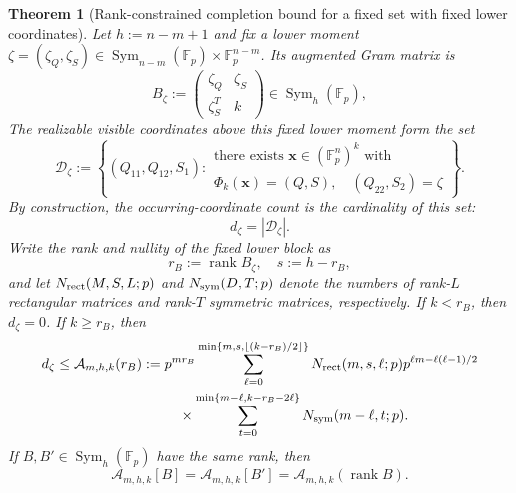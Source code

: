 \documentclass[11pt]{article}
\newcommand{\F}{\mathbb F}
\newcommand{\Sym}{\operatorname{Sym}}
\newcommand{\rank}{\operatorname{rank}}
\newcommand{\1}{\mathbf 1}
\theoremstyle{plain}
\newtheorem{theorem}{Theorem}[section]
\theoremstyle{definition}
\theoremstyle{remark}
\begin{document}
\begin{theorem}[Rank-constrained completion bound for a fixed set with fixed lower coordinates]
\label{thm:completion-bound-converse}
Let $h:=n-m+1$ and fix a lower moment
$\zeta=(\zeta_Q,\zeta_S)\in
\Sym_{n-m}(\F_p)\times\F_p^{n-m}$.  Its augmented Gram matrix is
\begin{equation}
 B_{\zeta}:=
 \begin{pmatrix}\zeta_Q&\zeta_S\\\zeta_S^T&k\end{pmatrix}
 \in\Sym_h(\F_p),
 \label{eq:completion-theorem-B-zeta}
\end{equation}
The realizable visible coordinates above this fixed lower moment form the set
\begin{equation}
 \mathcal D_{\zeta}:=
 \left\{(Q_{11},Q_{12},S_1):
 \begin{array}{l}
 \text{there exists }\boldsymbol x\in(\F_p^n)^k\text{ with }\\
 \Phi_k(\boldsymbol x)=(Q,S),\quad
 (Q_{22},S_2)=\zeta
 \end{array}\right\}.
 \label{eq:completion-theorem-D-zeta}
\end{equation}
By construction, the occurring-coordinate count is the cardinality of this set:
\begin{equation}
 d_{\zeta}=|\mathcal D_{\zeta}|.
 \label{eq:completion-theorem-d-zeta}
\end{equation}
Write the rank and nullity of the fixed lower block as
\begin{equation}
 r_B:=\rank B_{\zeta},\quad s:=h-r_B,
 \label{eq:lower-block-rank-nullity}
\end{equation}
and let $N_{\rm rect}(M,S,L;p)$ and $N_{\rm sym}(D,T;p)$ denote the numbers of
rank-$L$ rectangular matrices and rank-$T$ symmetric matrices, respectively.
If $k<r_B$, then $d_{\zeta}=0$.  If $k\ge r_B$, then
\begin{align}
 d_{\zeta}\le \mathcal A_{m,h,k}(r_B)
 :={}&p^{m r_B}
 \sum_{\ell=0}^{\min\{m,s,\lfloor(k-r_B)/2\rfloor\}}
 N_{\rm rect}(m,s,\ell;p)
 p^{\ell m-\ell(\ell-1)/2}\notag\\
 &\quad\times
 \sum_{t=0}^{\min\{m-\ell,k-r_B-2\ell\}}
 N_{\rm sym}(m-\ell,t;p).
 \label{eq:exact-completion-count}
\end{align}
If $B,B'\in\Sym_h(\F_p)$ have the same rank, then
\begin{equation}
 \mathcal A_{m,h,k}[B]=\mathcal A_{m,h,k}[B']
 =\mathcal A_{m,h,k}(\rank B).
 \label{eq:completion-count-rank-only-theorem}
\end{equation}


\end{theorem}
\end{document}
